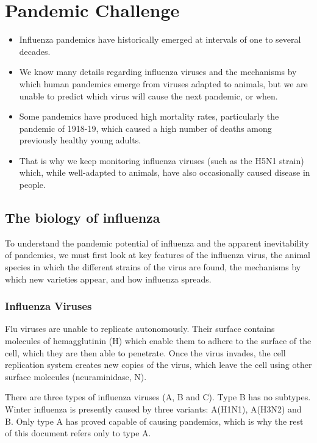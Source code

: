 \documentclass[12pt, a4]{scrartcl}
\begin{document}
\section{Pandemic Challenge}
\begin{mdframed}[leftmargin=10pt,rightmargin=10pt]
\begin{itemize}
	\item Influenza pandemics have historically emerged at intervals of one to several decades.
	\item We know many details regarding influenza viruses and the mechanisms by which human pandemics emerge from viruses adapted to animals, but we are unable to predict which virus will cause the next pandemic, or when.
	\item Some pandemics have produced high mortality rates, particularly the pandemic of 1918-19, which caused a high number of deaths among previously healthy young adults.
	\item That is why we keep monitoring influenza viruses (such as the H5N1 strain) which, while well-adapted to animals, have also occasionally caused disease in people.
\end{itemize}
\end{mdframed}

\subsection{The biology of influenza}
To understand the pandemic potential of influenza and the apparent inevitability of pandemics, we must first look at key features of the influenza virus, the animal species in which the different strains of the virus are found, the mechanisms by which new varieties appear, and how influenza spreads.

\subsubsection{Influenza Viruses}
Flu viruses are unable to replicate autonomously. Their surface contains molecules of hemagglutinin (H) which enable them to adhere to the surface of the cell, which they are then able to penetrate. Once the virus invades, the cell replication system creates new copies of the virus, which leave the cell using other surface molecules (neuraminidase, N).

There are three types of influenza viruses (A, B and C). Type B has no subtypes. Winter influenza is presently caused by three variants: A(H1N1), A(H3N2) and B. Only type A has proved capable of causing pandemics, which is why the rest of this document refers only to type A.
\end{document}
